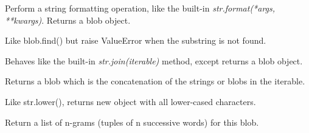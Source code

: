 \documentclass[letterpaper,10pt,english]{sphinxmanual}
\begin{document}
\begin{fulllineitems}
\begin{fulllineitems}
\label{api_reference:textblob_de.blob.Sentence.format}
Perform a string formatting operation, like the built-in
\emph{str.format(*args, **kwargs)}. Returns a blob object.

\end{fulllineitems}


\begin{fulllineitems}
\label{api_reference:textblob_de.blob.Sentence.index}
Like blob.find() but raise ValueError when the substring
is not found.

\end{fulllineitems}


\begin{fulllineitems}
\label{api_reference:textblob_de.blob.Sentence.join}
Behaves like the built-in \emph{str.join(iterable)} method, except
returns a blob object.

Returns a blob which is the concatenation of the strings or blobs
in the iterable.

\end{fulllineitems}


\begin{fulllineitems}
\label{api_reference:textblob_de.blob.Sentence.lower}
Like str.lower(), returns new object with all lower-cased characters.

\end{fulllineitems}


\begin{fulllineitems}
\label{api_reference:textblob_de.blob.Sentence.ngrams}
Return a list of n-grams (tuples of n successive words) for this
blob.

\end{fulllineitems}



\end{fulllineitems}
\end{document}

